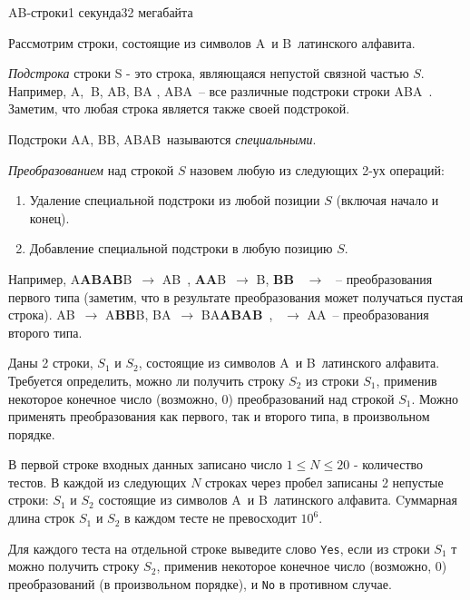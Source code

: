 \documentclass[11pt,a4paper,oneside]{article}
\newcommand{\qo}{\textquotesingle}
\newcommand{\qq}{\textquotesingle~}
\begin{document}
\begin{problem}{AB-строки}{1 секунда}{32 мегабайта}



Рассмотрим строки,  состоящие из символов \qo A\qq  и \qo B\qq латинского алфавита. 

\textit{Подстрока} строки S - это строка, являющаяся непустой связной частью $S$.  Например, \qo A\qo, $~$\qo B\qo, \qo AB\qo, \qo BA \qo, \qo ABA\qq -- все различные подстроки строки \qo ABA\qq.
Заметим, что  любая строка является также своей подстрокой.

Подстроки \qo AA\qo, \qo BB\qo, \qo ABAB\qq называются \textit{специальными}. 

\textit{Преобразованием} над строкой $S$ назовем любую из следующих 2-ух операций:
\begin{enumerate}
\item Удаление специальной подстроки  из любой позиции $S$ (включая начало и конец). 
\item Добавление специальной подстроки   в любую позицию $S$. 
\end{enumerate}

Например, \qo A\textbf{ABAB}B\qq $\to$ \qo AB\qq, \qo \textbf{AA}B\qq $\to$ \qo B\qo,  \textbf{\qo BB\qq} $\to$ \qo\qq -- преобразования первого типа (заметим, что в результате преобразования может получаться пустая строка). \qo AB\qq $\to$ \qo A\textbf{BB}B\qo, \qo BA\qq $\to$ \qo BA\textbf{ABAB}\qq , \qo\qq $\to$  \qo AA\qq -- преобразования второго типа.

Даны 2 строки, $S_1$ и $S_2$,  состоящие из символов \qo A\qq и \qo B\qq латинского алфавита. 
Требуется определить, можно ли получить строку $S_2$ из строки $S_1$, применив некоторое конечное число (возможно, 0) преобразований над строкой $S_1$. Можно применять преобразования как первого, так и второго типа, в произвольном порядке.


\InputFile

В первой строке входных данных записано число $1 \le N \le 20$ - количество тестов.
В каждой из следующих $N$ строках через пробел записаны 2 непустые строки: $S_1$ и $S_2$ состоящие из символов \qo A\qq и \qo B\qq латинского алфавита.
Cуммарная длина строк $S_1$ и $S_2$ в каждом тесте  не превосходит $10^6$.
\OutputFile

Для каждого теста на отдельной строке выведите слово \texttt{Yes}, если из строки $S_1$ т можно получить строку $S_2$, применив некоторое конечное число (возможно, 0) преобразований (в произвольном порядке), и \texttt{No} в противном случае.


\end{problem}
\end{document}
